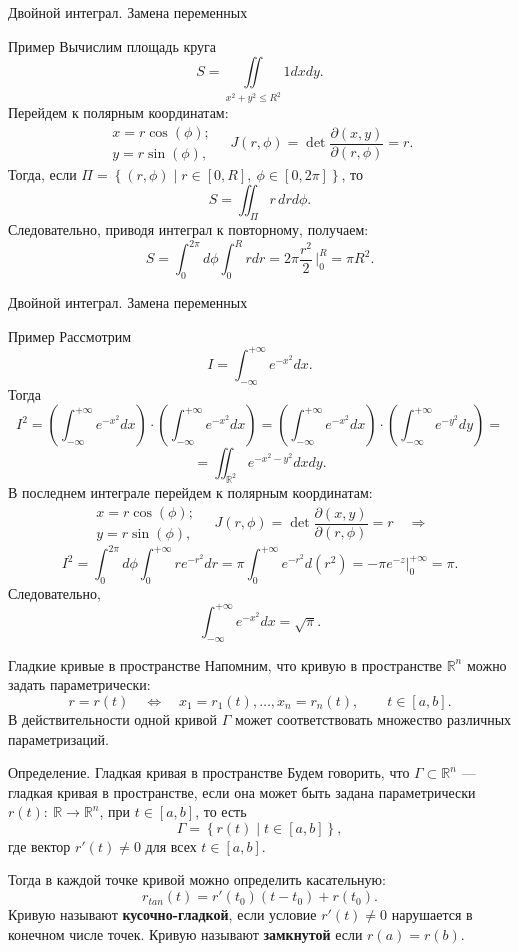 \documentclass[8pt]{beamer}
\newcommand{\pp}[2]{\frac{\partial #1}{\partial #2}}
\begin{document}
\begin{frame}{Двойной интеграл. Замена переменных}
\begin{block}{Пример}
Вычислим площадь круга
$$S = \iint\limits_{x^2+y^2\le R^2}1dxdy.$$
Перейдем к полярным координатам:
$$\begin{array}{l}
x = r \cos(\phi);\\
y = r \sin(\phi),
\end{array}
\quad J(r,\phi) = \det\pp{(x,y)}{(r,\phi)} = r.
$$
Тогда, если $\Pi = \left\{ (r,\phi)\mid r\in[0,R],\ \phi\in[0,2\pi]\right\}$, то
$$S = \iint_\Pi r\,drd\phi.$$
Следовательно, приводя интеграл к повторному, получаем:
$$S = \int_0^{2\pi}d\phi \int_0^R rdr = 2\pi \frac{r^2}{2}\,\Big|_0^R = \pi R^2.$$
\end{block}
\end{frame}

\begin{frame}{Двойной интеграл. Замена переменных}
\begin{block}{Пример}
Рассмотрим 
$$I = \int_{-\infty}^{+\infty}e^{-x^2}dx.$$
Тогда
$$I^2 = \left(\int_{-\infty}^{+\infty}e^{-x^2}dx\right) \cdot \left(\int_{-\infty}^{+\infty}e^{-x^2}dx\right) = \left(\int_{-\infty}^{+\infty}e^{-x^2}dx\right)\cdot \left(\int_{-\infty}^{+\infty}e^{-y^2}dy\right)=$$
$$ = \iint_{\mathbb{R}^2}e^{-x^2-y^2}dxdy.$$
В последнем интеграле перейдем к полярным координатам:
$$\begin{array}{l}
x = r \cos(\phi);\\
y = r \sin(\phi),
\end{array}
\quad J(r,\phi) = \det\pp{(x,y)}{(r,\phi)} = r\quad \Rightarrow
$$
$$I^2 = \int_0^{2\pi}d\phi \int_{0}^{+\infty}r e^{-r^2}dr = \pi \int_{0}^{+\infty}e^{-r^2}d(r^2) = -\pi e^{-z}\Big|_0^{+\infty} = \pi.$$
Следовательно,
$$\int_{-\infty}^{+\infty}e^{-x^2}dx = \sqrt{\pi}.$$
\end{block}
\end{frame}

\begin{frame}{Гладкие кривые в пространстве}
Напомним, что кривую в пространстве $\mathbb{R}^n$ можно задать параметрически:
$$r=r(t)\quad \iff\quad x_1=r_1(t),\ldots,x_n = r_n(t),\qquad t\in[a,b].$$
В действительности одной кривой $\Gamma$ может соответствовать множество различных параметризаций. 
\begin{block}{Определение. Гладкая кривая в пространстве}
Будем говорить, что $\Gamma\subset\mathbb{R}^n$ --- гладкая кривая в пространстве, если она может быть задана параметрически $r(t):\ \mathbb{R} \to \mathbb{R}^n$, при $t\in[a,b]$, то есть
$$\Gamma = \left\{ r(t) \mid t\in[a,b]\right\},$$
где вектор $r'(t)\ne0$ для всех $t\in[a,b]$.
\end{block}
Тогда в каждой точке кривой можно определить касательную:
$$r_{tan}(t) = r'(t_0)(t-t_0)+r(t_0).$$
Кривую называют {\bf кусочно-гладкой}, если условие $r'(t)\ne0$ нарушается в конечном числе точек. Кривую называют {\bf замкнутой} если $r(a) = r(b)$.
\end{frame}
\end{document}
